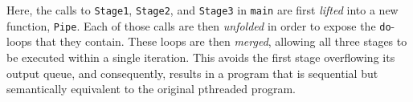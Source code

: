 \noindent 
Here, the calls to \lstinline|Stage1|, \lstinline|Stage2|, and \lstinline|Stage3| in \lstinline|main| are first \emph{lifted} into a new function, \lstinline|Pipe|. Each of those calls are then \emph{unfolded} in order to expose the \lstinline|do|-loops that they contain. These loops are then \emph{merged}, allowing all three stages to be executed within a single iteration. This avoids the first stage overflowing its output queue, and consequently, results in a program that is sequential but semantically equivalent to the original pthreaded program.




